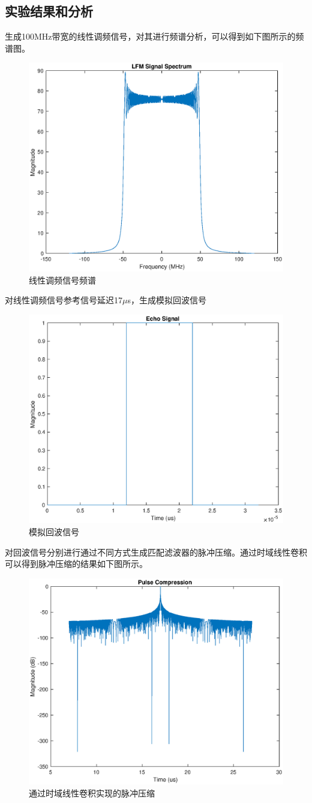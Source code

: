 \subsection{实验结果和分析}
生成100MHz带宽的线性调频信号，对其进行频谱分析，可以得到如下图所示的频谱图。
\begin{figure}[H]
	\centering
	\includegraphics[width=0.7\linewidth]{figure/LFMSignalSpectrum.eps}
	\caption{线性调频信号频谱}
\end{figure}
对线性调频信号参考信号延迟17$\mu$s，生成模拟回波信号
\begin{figure}[H]
	\centering
	\includegraphics[width=0.7\linewidth]{figure/LFMEchoSignal.eps}
	\caption{模拟回波信号}
\end{figure}
对回波信号分别进行通过不同方式生成匹配滤波器的脉冲压缩。通过时域线性卷积可以得到脉冲压缩的结果如下图所示。
\begin{figure}[H]
	\centering
	\includegraphics[width=0.7\linewidth]{figure/LinearConvolutionPulseCompression.eps}
	\caption{通过时域线性卷积实现的脉冲压缩}
\end{figure}
